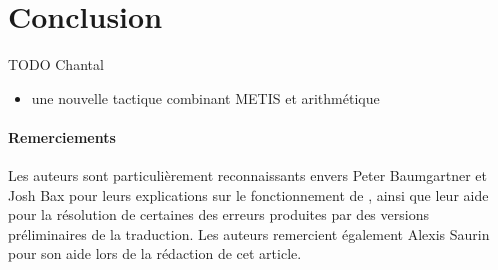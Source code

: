 \section{Conclusion}

TODO Chantal

\begin{itemize}
\item une nouvelle tactique combinant METIS et arithmétique
\end{itemize}


\paragraph{Remerciements}

Les auteurs sont particulièrement reconnaissants envers Peter
Baumgartner et Josh Bax pour leurs explications sur le fonctionnement de
\beagle, ainsi que leur aide pour la résolution de certaines des erreurs
produites par des versions préliminaires de la traduction. Les auteurs
remercient également Alexis Saurin pour son aide lors de la rédaction de
cet article.
